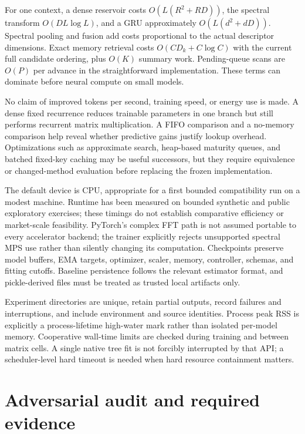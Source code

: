 \documentclass[11pt,a4paper]{article}
\begin{document}
For one context, a dense reservoir costs $O(L(R^2+RD))$, the spectral transform $O(DL\log L)$, and a GRU approximately $O(L(d^2+dD))$. Spectral pooling and fusion add costs proportional to the actual descriptor dimensions. Exact memory retrieval costs $O(CD_k+C\log C)$ with the current full candidate ordering, plus $O(K)$ summary work. Pending-queue scans are $O(P)$ per advance in the straightforward implementation. These terms can dominate before neural compute on small models.

No claim of improved tokens per second, training speed, or energy use is made. A dense fixed recurrence reduces trainable parameters in one branch but still performs recurrent matrix multiplication. A FIFO comparison and a no-memory comparison help reveal whether predictive gains justify lookup overhead. Optimizations such as approximate search, heap-based maturity queues, and batched fixed-key caching may be useful successors, but they require equivalence or changed-method evaluation before replacing the frozen implementation.

The default device is CPU, appropriate for a first bounded compatibility run on a modest machine. Runtime has been measured on bounded synthetic and public exploratory exercises; these timings do not establish comparative efficiency or market-scale feasibility. PyTorch's complex FFT path is not assumed portable to every accelerator backend; the trainer explicitly rejects unsupported spectral MPS use rather than silently changing its computation. Checkpoints preserve model buffers, EMA targets, optimizer, scaler, memory, controller, schemas, and fitting cutoffs. Baseline persistence follows the relevant estimator format, and pickle-derived files must be treated as trusted local artifacts only.

Experiment directories are unique, retain partial outputs, record failures and interruptions, and include environment and source identities. Process peak RSS is explicitly a process-lifetime high-water mark rather than isolated per-model memory. Cooperative wall-time limits are checked during training and between matrix cells. A single native tree fit is not forcibly interrupted by that API; a scheduler-level hard timeout is needed when hard resource containment matters.

\section{Adversarial audit and required evidence}
\end{document}
